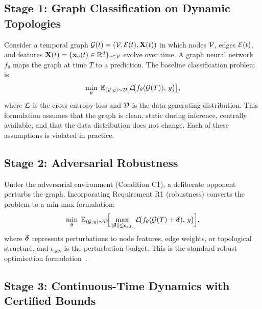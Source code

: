 \subsection{Stage 1: Graph Classification on Dynamic Topologies}

Consider a temporal graph $\mathcal{G}(t)=(\mathcal{V},\mathcal{E}(t),\mathbf{X}(t))$ in which nodes $\mathcal{V}$, edges $\mathcal{E}(t)$, and features $\mathbf{X}(t)=\{\mathbf{x}_v(t)\in\mathbb{R}^{d}\}_{v\in\mathcal{V}}$ evolve over time. A graph neural network $f_\theta$ maps the graph at time $T$ to a prediction. The baseline classification problem is
\begin{equation}
\min_\theta\;
\mathbb{E}_{(\mathcal{G},y)\sim\mathcal{D}}\!\bigl[
  \mathcal{L}\!\bigl(f_\theta(\mathcal{G}(T)),\,y\bigr)
\bigr],
\label{eq:ps_base}
\end{equation}
where $\mathcal{L}$ is the cross-entropy loss and $\mathcal{D}$ is the data-generating distribution. This formulation assumes that the graph is clean, static during inference, centrally available, and that the data distribution does not change. Each of these assumptions is violated in practice.


\subsection{Stage 2: Adversarial Robustness}

Under the adversarial environment (Condition C1), a deliberate opponent perturbs the graph. Incorporating Requirement R1 (robustness) converts the problem to a min-max formulation:
\begin{equation}
\min_\theta\;
\mathbb{E}_{(\mathcal{G},y)\sim\mathcal{D}}\!\Bigl[
  \max_{\|\boldsymbol{\delta}\|\le\epsilon_{\mathrm{adv}}}
    \mathcal{L}\!\bigl(f_\theta(\mathcal{G}(T)+\boldsymbol{\delta}),\,y\bigr)
\Bigr],
\label{eq:ps_robust}
\end{equation}
where $\boldsymbol{\delta}$ represents perturbations to node features, edge weights, or topological structure, and $\epsilon_{\mathrm{adv}}$ is the perturbation budget. This is the standard robust optimisation formulation~\cite{Madry2018,Goodfellow2015,Szegedy2014}.


\subsection{Stage 3: Continuous-Time Dynamics with Certified Bounds}

